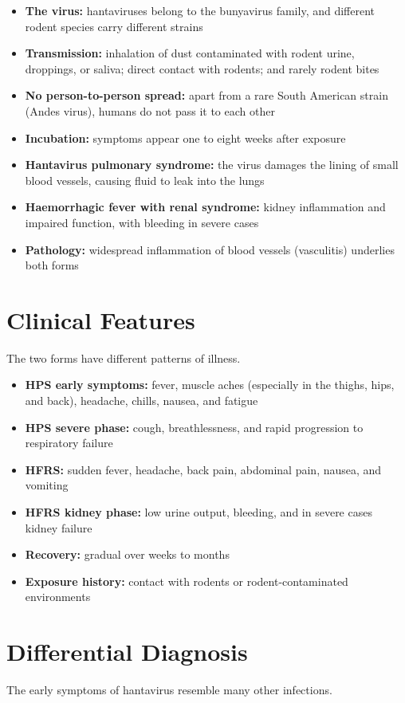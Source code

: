 \begin{itemize}
    \item \textbf{The virus:} hantaviruses belong to the bunyavirus family, and different rodent species carry different strains
    \item \textbf{Transmission:} inhalation of dust contaminated with rodent urine, droppings, or saliva; direct contact with rodents; and rarely rodent bites
    \item \textbf{No person-to-person spread:} apart from a rare South American strain (Andes virus), humans do not pass it to each other
    \item \textbf{Incubation:} symptoms appear one to eight weeks after exposure
    \item \textbf{Hantavirus pulmonary syndrome:} the virus damages the lining of small blood vessels, causing fluid to leak into the lungs
    \item \textbf{Haemorrhagic fever with renal syndrome:} kidney inflammation and impaired function, with bleeding in severe cases
    \item \textbf{Pathology:} widespread inflammation of blood vessels (vasculitis) underlies both forms
\end{itemize}

\section*{Clinical Features}
The two forms have different patterns of illness.

\begin{itemize}
    \item \textbf{HPS early symptoms:} fever, muscle aches (especially in the thighs, hips, and back), headache, chills, nausea, and fatigue
    \item \textbf{HPS severe phase:} cough, breathlessness, and rapid progression to respiratory failure
    \item \textbf{HFRS:} sudden fever, headache, back pain, abdominal pain, nausea, and vomiting
    \item \textbf{HFRS kidney phase:} low urine output, bleeding, and in severe cases kidney failure
    \item \textbf{Recovery:} gradual over weeks to months
    \item \textbf{Exposure history:} contact with rodents or rodent-contaminated environments
\end{itemize}

\section*{Differential Diagnosis}
The early symptoms of hantavirus resemble many other infections.

